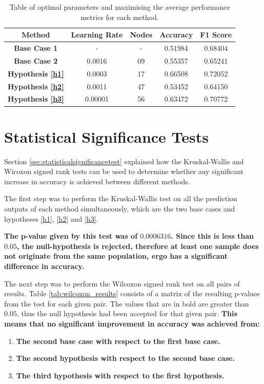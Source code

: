 \documentclass{UoYCSproject}
\begin{document}
\begin{table}[h]
    \centering
    \begin{tabular}{|c|c|c|c|c|} \hline
        \textbf{Method} & \textbf{Learning Rate} & \textbf{Nodes} & \textbf{Accuracy} & \textbf{F1 Score} \\ \hline
        \textbf{Base Case 1} & - & - & 0.51984 & 0.68404 \\
        \textbf{Base Case 2} & 0.0016 & 09 & 0.55357 & 0.65241 \\
        \textbf{Hypothesis \ref{h1}} & 0.0003 & 17 & 0.66508 & 0.72052 \\
        \textbf{Hypothesis \ref{h2}} & 0.0011 & 47 & 0.53452 & 0.64150 \\
        \textbf{Hypothesis \ref{h3}} & 0.00001 & 56 & 0.63472 & 0.70772  \\
        \hline
    \end{tabular}
    \caption{Table of optimal parameters and maximising the average performance metrics for each method.}
    \label{tab:test_results}
\end{table}



\section{Statistical Significance Tests}
Section \ref{sec:statisticalsignificancetest} explained how the Kruskal-Wallis and Wicoxon signed rank tests can be used to determine whether any significant increase in accuracy is achieved between different methods. 

The first step was to perform the Kruskal-Wallis test on all the prediction outputs of each method simultaneously, which are the two base cases and hypotheses \ref{h1}, \ref{h2} and \ref{h3}. 
    
\textbf{The p-value given by this test was of $\boldsymbol{0.0006316}$. Since this is less than $\boldsymbol{0.05}$, the null-hypothesis is rejected, therefore at least one sample does not originate from the same population, ergo has a significant difference in accuracy.}

The next step was to perform the Wilcoxon signed rank test on all pairs of results. Table \ref{tab:wilcoxon_results} consists of a matrix of the resulting p-values from the test for each given pair. The values that are in bold are greater than $0.05$, thus the null hypothesis had been accepted for that given pair. \textbf{This means that no significant improvement in accuracy was achieved from:}
\begin{enumerate}
    \item \textbf{The second base case with respect to the first base case.}
    \item\textbf{ The second hypothesis with respect to the second base case.}
    \item \textbf{The third hypothesis with respect to the first hypothesis.}
\end{enumerate}
\end{document}
